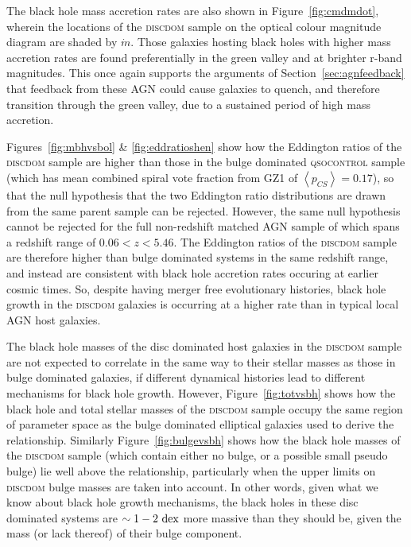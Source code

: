 {The black hole mass accretion rates are also shown in Figure~\ref{fig:cmdmdot}, wherein the locations of the \textsc{discdom} sample on the optical colour magnitude diagram are shaded by $\dot{m}$. Those galaxies hosting black holes with higher mass accretion rates are found preferentially in the green valley and at brighter r-band magnitudes. This once again supports the arguments of Section~\ref{sec:agnfeedback} that feedback from these AGN could cause galaxies to quench, and therefore transition through the green valley, due to a sustained period of high mass accretion.

Figures~\ref{fig:mbhvsbol} \& \ref{fig:eddratioshen} show how the Eddington ratios of the \textsc{discdom} sample are higher than those in the bulge dominated \textsc{qsocontrol} sample (which has mean combined spiral vote fraction from GZ1 of $\left<p_{CS} \right> = 0.17$), so that the null hypothesis that the two Eddington ratio distributions are drawn from the same parent sample can be rejected. However, the same null hypothesis cannot be rejected for the full non-redshift matched AGN sample of \citet{shen11} which spans a redshift range of $0.06 < z < 5.46$. The Eddington ratios of the \textsc{discdom} sample are therefore higher than bulge dominated systems in the same redshift range, and instead are consistent with black hole accretion rates occuring at earlier cosmic times. So, despite having merger free evolutionary histories, black hole growth in the \textsc{discdom} galaxies is occurring at a higher rate than in typical local AGN host galaxies.  

The black hole masses of the disc dominated host galaxies in the \textsc{discdom} sample are not expected to correlate in the same way to their stellar masses as those in bulge dominated galaxies, if different dynamical histories lead to different mechanisms for black hole growth. However, Figure~\ref{fig:totvsbh} shows how the black hole and total stellar masses of the \textsc{discdom} sample occupy the same region of parameter space as the bulge dominated elliptical galaxies used to derive the \citet{haringrix04} relationship. Similarly Figure~\ref{fig:bulgevsbh} shows how the black hole masses of the \textsc{discdom} sample (which contain either no bulge, or a possible small pseudo bulge) lie well above the \citet{haringrix04} relationship, particularly when the upper limits on \textsc{discdom} bulge masses are taken into account. In other words, given what we know about black hole growth mechanisms, the black holes in these disc dominated systems are $\sim1-2~\rm{dex}$ more massive than they should be, given the mass (or lack thereof) of their bulge component. 

}
